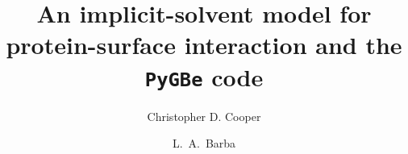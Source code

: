 \documentclass[final,5p,times,twocolumn]{elsarticle}
\newcommand{\pygbe}{\texttt{PyGBe}\xspace}
\begin{document}
\begin{frontmatter}



\title{An implicit-solvent model for protein-surface interaction and the \pygbe code} %

\author[bu]{Christopher D. Cooper}

\author[gwu]{L.~A.~Barba}

\address[bu]{Department of Mechanical Engineering, Boston University, Boston, MA.}
\address[gwu]{Department of Mechanical \& Aerospace Engineering, The George Washington University, Washington, D.C.}


\begin{abstract}


\end{abstract}
\end{frontmatter}
\end{document}
